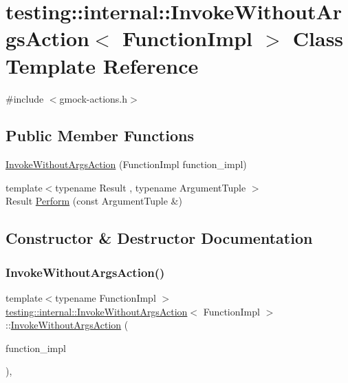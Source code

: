 \hypertarget{classtesting_1_1internal_1_1InvokeWithoutArgsAction}{}\section{testing\+::internal\+::Invoke\+Without\+Args\+Action$<$ Function\+Impl $>$ Class Template Reference}
\label{classtesting_1_1internal_1_1InvokeWithoutArgsAction}


{\ttfamily \#include $<$gmock-\/actions.\+h$>$}

\subsection*{Public Member Functions}
\begin{DoxyCompactItemize}
\item 
\mbox{\hyperlink{classtesting_1_1internal_1_1InvokeWithoutArgsAction_a05d4006d8ab70e78172bf678b1d15f18}{Invoke\+Without\+Args\+Action}} (Function\+Impl function\+\_\+impl)
\item 
{\footnotesize template$<$typename Result , typename Argument\+Tuple $>$ }\\Result \mbox{\hyperlink{classtesting_1_1internal_1_1InvokeWithoutArgsAction_abdad2b7d19ff1cbd1d07a4bd585e3f4c}{Perform}} (const Argument\+Tuple \&)
\end{DoxyCompactItemize}


\subsection{Constructor \& Destructor Documentation}
\mbox{\label{classtesting_1_1internal_1_1InvokeWithoutArgsAction_a05d4006d8ab70e78172bf678b1d15f18}} 
\subsubsection{\texorpdfstring{InvokeWithoutArgsAction()}{InvokeWithoutArgsAction()}}
{\footnotesize\ttfamily template$<$typename Function\+Impl $>$ \\
\mbox{\hyperlink{classtesting_1_1internal_1_1InvokeWithoutArgsAction}{testing\+::internal\+::\+Invoke\+Without\+Args\+Action}}$<$ Function\+Impl $>$\+::\mbox{\hyperlink{classtesting_1_1internal_1_1InvokeWithoutArgsAction}{Invoke\+Without\+Args\+Action}} (\begin{DoxyParamCaption}\item[{Function\+Impl}]{function\+\_\+impl }\end{DoxyParamCaption})\hspace{0.3cm}{\ttfamily [inline]}, {\ttfamily [explicit]}}



